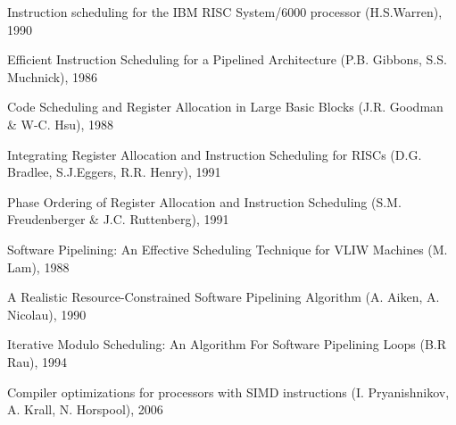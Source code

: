 \documentclass[a4paper,10pt]{article}
\begin{document}
\begin{thebibliography}{9}
Instruction scheduling for the IBM RISC System/6000 processor (H.S.Warren), 1990

Efficient Instruction Scheduling for a Pipelined Architecture (P.B. Gibbons, S.S. Muchnick), 1986

Code Scheduling and Register Allocation in Large Basic Blocks (J.R. Goodman \& W-C. Hsu), 1988

Integrating Register Allocation and Instruction Scheduling for RISCs (D.G. Bradlee, S.J.Eggers, R.R. Henry), 1991

Phase Ordering of Register Allocation and Instruction Scheduling (S.M. Freudenberger \& J.C. Ruttenberg), 1991

Software Pipelining: An Effective Scheduling Technique for VLIW Machines (M. Lam), 1988

A Realistic Resource-Constrained Software Pipelining Algorithm (A. Aiken, A. Nicolau), 1990

Iterative Modulo Scheduling: An Algorithm For Software Pipelining Loops (B.R Rau), 1994

Compiler optimizations for processors with SIMD instructions (I. Pryanishnikov, A. Krall, N. Horspool), 2006

\end{thebibliography}
\end{document}
